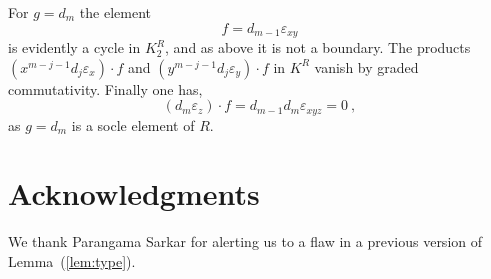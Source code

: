 \documentclass{amsart}
\theoremstyle{bfupright head,upright body}
\theoremstyle{fixed bf head,slanted body}
\theoremstyle{fixed bf head,upright body}
\theoremstyle{numbered paragraph}
\newenvironment{prf*}[1][Proof]{%
  \begin{proof}[\bf #1]
    \setcounter{equation}{0}
    \renewcommand{\theequation}{\arabic{equation}}}
  {\end{proof}
}
\newcommand{\pgref}[1]{(\ref{#1})}
\newcommand{\lemref}[2][Lemma~]{#1\pgref{lem:#2}}
\newcommand{\e}[1]{\varepsilon_{#1}}
\numberwithin{equation}{res}
\begin{document}
\begin{prf*}
  For $g=d_m$ the element
  \begin{equation*}
    f = d_{m-1}\e{xy}
  \end{equation*}
  is evidently a cycle in $K^R_2$, and as above it is not a boundary.
  The products $(x^{m-j-1}d_j\e{x})\cdot f$ and
  $(y^{m-j-1}d_j\e{y})\cdot f$ in $K^R$ vanish by graded
  commutativity. Finally one has,
  \begin{equation*}
    (d_m\e{z})\cdot f = d_{m-1}d_m\e{xyz}=0\:,
  \end{equation*}
  as $g=d_m$ is a socle element of $R$.
\end{prf*}

\section*{Acknowledgments}

We thank Parangama Sarkar for alerting us to a flaw in a previous version of \lemref{type}.


\end{document}
